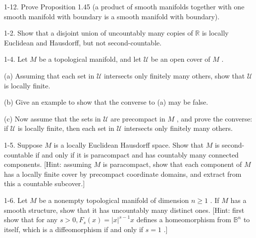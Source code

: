 \begin{exercise}
\label{prob:1-12}


1-12. Prove Proposition 1.45 (a product of smooth manifolds together with one smooth manifold with boundary is a smooth manifold with boundary).
\end{exercise}

\begin{exercise}
\label{prob:1-2}


1-2. Show that a disjoint union of uncountably many copies of $\mathbb{R}$ is locally Euclidean and Hausdorff, but not second-countable.
\end{exercise}

\begin{exercise}
\label{prob:1-4}


1-4. Let $M$ be a topological manifold, and let $\mathcal{U}$ be an open cover of $M$ .

(a) Assuming that each set in $\mathcal{U}$ intersects only finitely many others, show that $\mathcal{U}$ is locally finite.

(b) Give an example to show that the converse to (a) may be false.

(c) Now assume that the sets in $\mathcal{U}$ are precompact in $M$ , and prove the converse: if $\mathcal{U}$ is locally finite, then each set in $\mathcal{U}$ intersects only finitely many others.
\end{exercise}

\begin{exercise}
\label{prob:1-5}


1-5. Suppose $M$ is a locally Euclidean Hausdorff space. Show that $M$ is second-countable if and only if it is paracompact and has countably many connected components. [Hint: assuming $M$ is paracompact, show that each component of $M$ has a locally finite cover by precompact coordinate domains, and extract from this a countable subcover.]
\end{exercise}

\begin{exercise}
\label{prob:1-6}


1-6. Let $M$ be a nonempty topological manifold of dimension $n \geq  1$ . If $M$ has a smooth structure, show that it has uncountably many distinct ones. [Hint: first show that for any $s > 0,{F}_{s}\left( x\right)  = {\left| x\right| }^{s - 1}x$ defines a homeomorphism from ${\mathbb{B}}^{n}$ to itself, which is a diffeomorphism if and only if $s = 1$ .]
\end{exercise}


